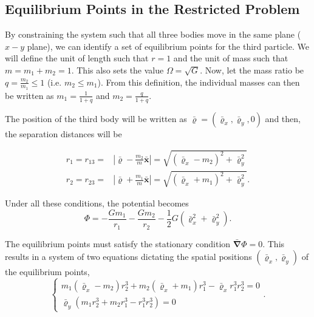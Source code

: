 \subsection{Equilibrium Points in the Restricted Problem}

By constraining the system such that all three bodies move in the same plane ($x-y$ plane), we can identify a set of equilibrium points for the third particle. We will define the unit of length such that $r=1$ and the unit of mass such that $m = m_1 + m_2 = 1$. This also sets the value $\Omega = \sqrt{G}$. Now, let the mass ratio be $q = \frac{m_2}{m_1} \le 1$ (i.e. $m_2 \leq m_1$). From this definition, the individual masses can then be written as $m_1 = \frac{1}{1+q}$ and $m_2 = \frac{q}{1+q}$.

The position of the third body will be written as $\bar{\boldsymbol{\varrho}} = (\bar{\varrho}_x, \bar{\varrho}_y,0)$ and then, the separation distances will be

\begin{subequations}
    \begin{align}
        r_1 = r_{13} = &\left\vert{}\bar{\boldsymbol{\varrho}}-\frac{m_{2}}{m}\bar{\textbf{x}}\right\vert{} = \sqrt{(\bar{\varrho}_x - m_2)^2 + \bar{\varrho}_y^2}\\
        r_2 = r_{23} = &\left\vert{}\bar{\boldsymbol{\varrho}}+\frac{m_{1}}{m}\bar{\textbf{x}}\right\vert{} = \sqrt{(\bar{\varrho}_x + m_1)^2 + \bar{\varrho}_y^2}.
    \end{align}
\end{subequations}

Under all these  conditions, the potential becomes
\begin{equation}
    \Phi=-\frac{Gm_{1}}{r_{1}}-\frac{Gm_{2}}{r_{2}}-\frac{1}{2}G(\bar{\varrho}_{x}^{2}+\bar{\varrho}_{y}^{2}).
\end{equation}



The equilibrium points must satisfy the stationary condition $\bar{\boldsymbol{\nabla}}\Phi = 0$. This results in a system of two equations dictating the spatial positions $(\bar{\varrho}_x, \bar{\varrho}_y)$ of the equilibrium points,
\begin{equation}
    \begin{cases}
        m_{1}(\bar{\varrho}_{x}-m_{2})r_{2}^{3}+m_{2}(\bar{\varrho}_{x}+m_{1})r_{1}^{3}-\bar{\varrho}_{x}r_{1}^{3}r_{2}^{3}=0 \\ 
        \bar{\varrho}_{y}(m_{1}r_{2}^{3}+m_{2}r_{1}^{3}-r_{1}^{3}r_{2}^{3})=0
    \end{cases}.\label{eq:EquilibriumPointsEquations}
\end{equation}

